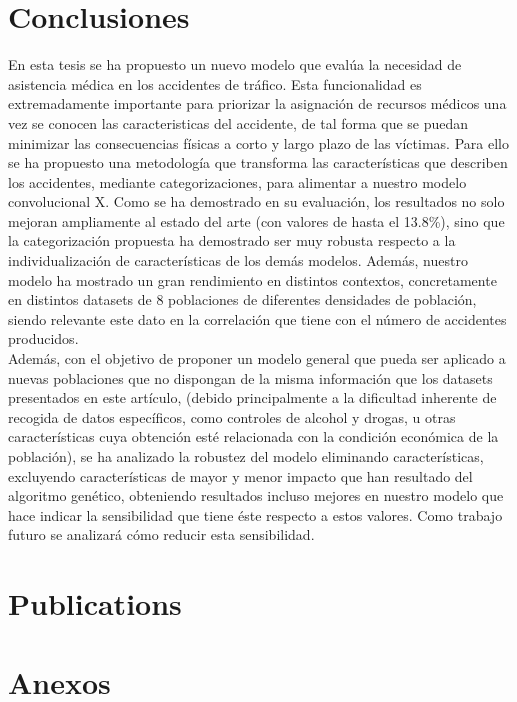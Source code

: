 \documentclass{uathesis-es}
\begin{document}
\chapter{Conclusiones}


En esta tesis se ha propuesto un nuevo modelo que evalúa la necesidad de asistencia médica en los accidentes de tráfico. Esta funcionalidad es extremadamente importante para priorizar la asignación de recursos médicos una vez se conocen las caracteristicas del accidente, de tal forma que se puedan minimizar las consecuencias físicas a corto y largo plazo de las víctimas. Para ello se ha propuesto una metodología que transforma las características que describen los accidentes, mediante categorizaciones, para alimentar a nuestro modelo convolucional X. Como se ha demostrado en su evaluación, los resultados no solo mejoran ampliamente al estado del arte (con valores de hasta el 13.8\%), sino que la categorización propuesta ha demostrado ser muy robusta respecto a la individualización de características de los demás modelos. Además, nuestro modelo ha mostrado un gran rendimiento en distintos contextos, concretamente en  distintos datasets de 8 poblaciones de diferentes densidades de población, siendo relevante este dato en la correlación que tiene con el número de accidentes producidos.\\

Además, con el objetivo de proponer un modelo general que pueda ser aplicado a nuevas poblaciones que no dispongan de la misma información que los datasets presentados en este artículo, (debido principalmente a la dificultad inherente de recogida de datos específicos, como controles de alcohol y drogas, u otras características cuya obtención esté relacionada con la condición económica de la población), se ha analizado la robustez del modelo eliminando características, excluyendo características de mayor y menor impacto que han resultado del algoritmo genético, obteniendo resultados incluso mejores en nuestro modelo que hace indicar la sensibilidad que tiene éste respecto a estos valores. Como trabajo futuro se analizará cómo reducir esta sensibilidad.

\chapter{Publications}






\chapter{Anexos}
\end{document}
